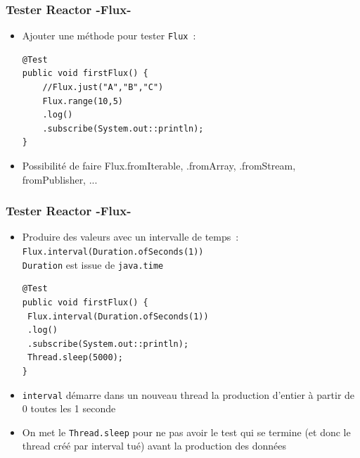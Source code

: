 \documentclass{beamer}
\begin{document}
\begin{frame}[fragile]
	\frametitle{Tester Reactor -Flux-}	
	
	\begin{itemize}
		\item Ajouter une méthode pour tester \texttt{Flux}~:
\begin{lstlisting}
@Test
public void firstFlux() {
	//Flux.just("A","B","C")
	Flux.range(10,5)
	.log()
	.subscribe(System.out::println);
}
\end{lstlisting}
\item Possibilité de faire Flux.fromIterable, .fromArray, .fromStream, fromPublisher, ...

	\end{itemize}
\end{frame}

\begin{frame}[fragile]
	\frametitle{Tester Reactor -Flux-}	
	
	\begin{itemize}
		\item Produire des valeurs avec un intervalle de temps~:\\
		\texttt{Flux.interval(Duration.ofSeconds(1))}\\
		\texttt{Duration} est issue de \texttt{java.time}
\begin{lstlisting}
@Test
public void firstFlux() {
 Flux.interval(Duration.ofSeconds(1))
 .log()
 .subscribe(System.out::println);
 Thread.sleep(5000);
}
\end{lstlisting}
	\item \texttt{interval} démarre dans un nouveau thread la production d'entier à partir de 0 toutes les 1 seconde
	\item On met le \texttt{Thread.sleep} pour ne pas avoir le test qui se termine (et donc le thread créé par interval tué) avant la production des données
	\end{itemize}
\end{frame}
\end{document}
